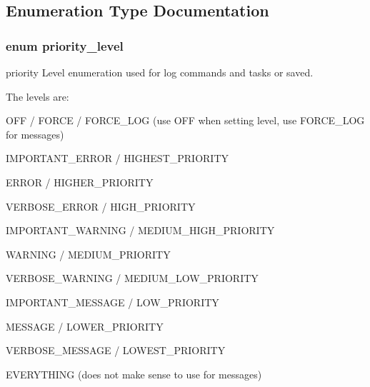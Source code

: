 \subsection{Enumeration Type Documentation}
\hypertarget{group__subsys_ga1d309594956a828563f9181d766daa08}{
\subsubsection[{priority\+\_\+level}]{\setlength{\rightskip}{0pt plus 5cm}enum {\bf priority\+\_\+level}}}\label{group__subsys_ga1d309594956a828563f9181d766daa08}


priority Level enumeration used for log commands and tasks or saved. 

The levels are\+:
\begin{DoxyItemize}
\item O\+F\+F / F\+O\+R\+C\+E / F\+O\+R\+C\+E\+\_\+\+L\+O\+G (use O\+F\+F when setting level, use F\+O\+R\+C\+E\+\_\+\+L\+O\+G for messages)
\item I\+M\+P\+O\+R\+T\+A\+N\+T\+\_\+\+E\+R\+R\+O\+R / H\+I\+G\+H\+E\+S\+T\+\_\+\+P\+R\+I\+O\+R\+I\+T\+Y
\item E\+R\+R\+O\+R / H\+I\+G\+H\+E\+R\+\_\+\+P\+R\+I\+O\+R\+I\+T\+Y
\item V\+E\+R\+B\+O\+S\+E\+\_\+\+E\+R\+R\+O\+R / H\+I\+G\+H\+\_\+\+P\+R\+I\+O\+R\+I\+T\+Y
\item I\+M\+P\+O\+R\+T\+A\+N\+T\+\_\+\+W\+A\+R\+N\+I\+N\+G / M\+E\+D\+I\+U\+M\+\_\+\+H\+I\+G\+H\+\_\+\+P\+R\+I\+O\+R\+I\+T\+Y
\item W\+A\+R\+N\+I\+N\+G / M\+E\+D\+I\+U\+M\+\_\+\+P\+R\+I\+O\+R\+I\+T\+Y
\item V\+E\+R\+B\+O\+S\+E\+\_\+\+W\+A\+R\+N\+I\+N\+G / M\+E\+D\+I\+U\+M\+\_\+\+L\+O\+W\+\_\+\+P\+R\+I\+O\+R\+I\+T\+Y
\item I\+M\+P\+O\+R\+T\+A\+N\+T\+\_\+\+M\+E\+S\+S\+A\+G\+E / L\+O\+W\+\_\+\+P\+R\+I\+O\+R\+I\+T\+Y
\item M\+E\+S\+S\+A\+G\+E / L\+O\+W\+E\+R\+\_\+\+P\+R\+I\+O\+R\+I\+T\+Y
\item V\+E\+R\+B\+O\+S\+E\+\_\+\+M\+E\+S\+S\+A\+G\+E / L\+O\+W\+E\+S\+T\+\_\+\+P\+R\+I\+O\+R\+I\+T\+Y
\item E\+V\+E\+R\+Y\+T\+H\+I\+N\+G (does not make sense to use for messages)
\end{DoxyItemize}

